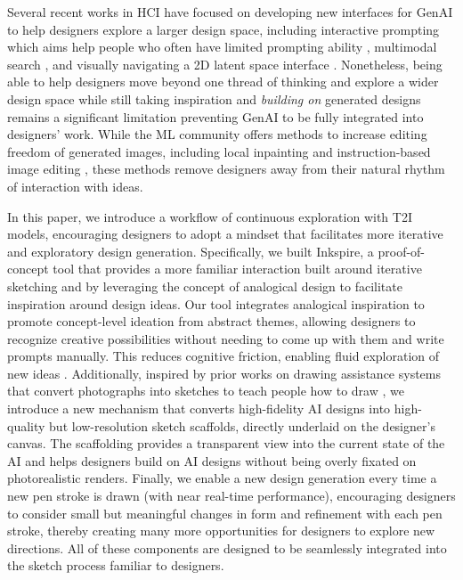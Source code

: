 \documentclass[sigconf, screen]{acmart}
\begin{document}
Several recent works in HCI have focused on developing new interfaces for GenAI to help designers explore a larger design space, including interactive prompting which aims help people who often have limited prompting ability \cite{brade2023promptify}, multimodal search \cite{son2024genquery}, and visually navigating a 2D latent space interface \cite{davis2024fashioning}. 
Nonetheless, being able to help designers move beyond one thread of thinking and  explore a wider design space while still taking inspiration and \textit{building on} generated designs remains a significant limitation preventing GenAI to be fully integrated into designers' work. While the ML community offers methods to increase editing freedom of generated images, including local inpainting \cite{saharia2022palette} and instruction-based image editing \cite{brooks2023instructpix2pix}, these methods remove designers away from their natural rhythm of interaction with ideas.

In this paper, we introduce a workflow of continuous exploration with T2I models, encouraging designers to adopt a mindset that facilitates more iterative and exploratory design generation.
Specifically, we built Inkspire, a proof-of-concept tool that provides a more familiar interaction built around iterative sketching and by leveraging the concept of analogical design to facilitate inspiration around design ideas.
Our tool integrates analogical inspiration to promote concept-level ideation from abstract themes, allowing designers to recognize creative possibilities without needing to come up with them and write prompts manually. 
This reduces cognitive friction, enabling fluid exploration of new ideas \cite{budiu2014memory}.
Additionally, inspired by prior works on drawing assistance systems that convert photographs into sketches to teach people how to draw \cite{lee2011shadowdraw}, we introduce a new mechanism that converts high-fidelity AI designs into high-quality but low-resolution sketch scaffolds, directly underlaid on the designer's canvas.
The scaffolding provides a transparent view into the current state of the AI and helps designers build on AI designs without being overly fixated on photorealistic renders.
Finally, we enable a new design generation every time a new pen stroke is drawn (with near real-time performance), encouraging designers to consider small but meaningful changes in form and refinement with each pen stroke, thereby creating many more opportunities for designers to explore new directions.
All of these components are designed to be seamlessly integrated into the sketch process familiar to designers.
\end{document}
